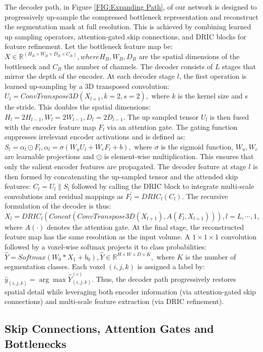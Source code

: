 The decoder path, in Figure \ref{FIG:Expanding Path}, of our network is designed to progressively up-sample the compressed bottleneck representation and reconstruct the segmentation mask at full resolution. This is achieved by combining learned up sampling operators, attention-gated skip connections, and DRIC blocks for feature refinement.
Let the bottleneck feature map be: $X\in \mathbb{R}^{(H_B\times W_B\times D_B\times C_B)}, where H_B, W_B, D_B$ are the spatial dimensions of the bottleneck and $C_B$ the number of channels. The decoder consists of $L$ stages that mirror the depth of the encoder.
At each decoder stage $l$, the first operation is learned up-sampling by a 3D transposed convolution: $U_l=ConvTranspose3D(X_{l+1},k=2,s=2),$ where $k$ is the kernel size and s the stride. This doubles the spatial dimensions: $H_l=2H_{l-1}, W_l=2W_{l-1}, D_l=2D_{l-1}$.
The up sampled tensor $U_l$ is then fused with the encoder feature map $F_l$ via an attention gate. The gating function suppresses irrelevant encoder activations and is defined as: $S_l=\alpha_l\odot F_l, \alpha_l=\sigma(W_u U_l+W_e F_l+b),$ where $\sigma$ is the sigmoid function, $W_u, W_e$ are learnable projections and $\odot $ is element-wise multiplication. This ensures that only the salient encoder features are propagated.
The decoder feature at stage $l$ is then formed by concatenating the up-sampled tensor and the attended skip features: $C_l= U_l \| S_l$ followed by calling the DRIC block to integrate multi-scale convolutions and residual mappings as $F_l^{'}= DRIC_l (C_l)$.
The recursive formulation of the decoder is thus: {\footnotesize$X_l= DRIC_l (Concat(ConvTranspose3D(X_{l+1}),A(F_l,X_{l+1}))), l = L,\cdots,1,$} where $A(\cdot)$ denotes the attention gate.
At the final stage, the reconstructed feature map has the same resolution as the input volume. A $1\times 1\times 1$ convolution followed by a voxel-wise softmax projects it to class probabilities: $\hat{Y} = Softmax(W_0 * X_1 + b_0), \hat{Y} \in \mathbb{R}^{H\times W\times D\times K},$ where $K$ is the number of segmentation classes. Each voxel $(i,j,k)$ is assigned a label by: $\hat{y}_{(i,j,k)} = \arg\max \hat{Y}^{(c)}_{(i,j,k)}$.
Thus, the decoder path progressively restores spatial detail while leveraging both encoder information (via attention-gated skip connections) and multi-scale feature extraction (via DRIC refinement).


\subsection{Skip Connections, Attention Gates and Bottlenecks}

